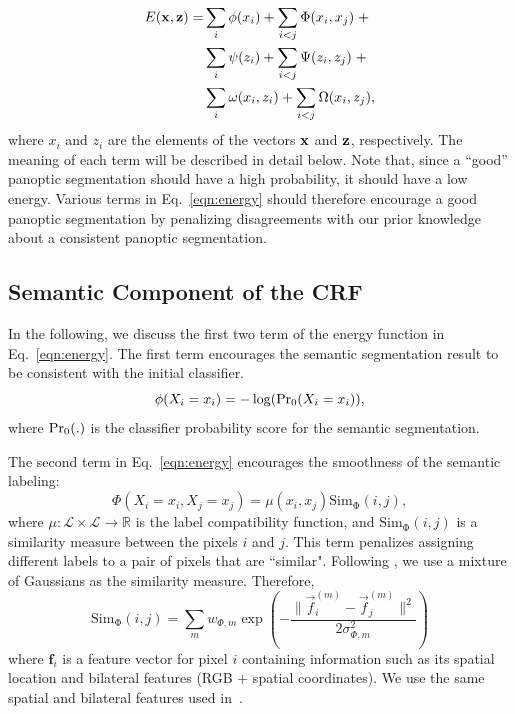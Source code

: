 \begin{equation}
\label{eqn:energy}
\begin{split}
E(\mathbf{x}, \mathbf{z}) =& \sum_i\phi(x_i) + \sum_{i < j}\Phi(x_i, x_j) \;+ \\
& \sum_i\psi(z_i) + \sum_{i < j}\Psi(z_i, z_j) \; + \\
& \sum_i\omega(x_i, z_i) + \sum_{i < j}\Omega(x_i, z_j),
\end{split}
\end{equation}
where $x_i$ and $z_i$ are the elements of the vectors $\mathbf{x}$ and $\mathbf{z}$, respectively. The meaning of each term will be described in detail below. Note that, since a ``good'' panoptic segmentation should have a high probability, it should have a low energy. Various terms in Eq.~\eqref{eqn:energy} should therefore encourage a good panoptic segmentation by penalizing disagreements with our prior knowledge about a consistent panoptic segmentation. %

\subsection{Semantic Component of the CRF}
In the following, we discuss the first two term of the energy function in Eq.~\eqref{eqn:energy}. The first term encourages the semantic segmentation result to be consistent with the initial classifier.
\begin{equation}
\phi(X_i = x_i) = - \log(\operatorname{Pr_0}(X_i = x_i)),
\end{equation}
where $\operatorname{Pr_0}(.)$ is the classifier probability score for the semantic segmentation. 

The second term in Eq.~\eqref{eqn:energy} encourages the smoothness of the semantic labeling:
\begin{equation}
\label{eq:similarity}
\Phi(X_i = x_i, X_j = x_j) = \mu(x_i, x_j) \operatorname{Sim_\Phi}(i, j),
\end{equation}
where $\mu: \mathcal{L} \times \mathcal{L} \to \mathbb{R}$ is the label compatibility function, and $\operatorname{Sim_\Phi}(i, j)$ is a similarity measure between the pixels $i$ and $j$. This term penalizes assigning different labels to a pair of pixels that are ``similar". Following \cite{densecrf}, we use a mixture of Gaussians as the similarity measure. Therefore,
\begin{equation}
\label{eqn:kernels}
\operatorname{Sim_\Phi}(i, j) = \sum_m w_{\Phi, m} \exp\left(-\frac{\|\vec{f}_i^{(m)} - \vec{f}_j^{(m)}\|^2}{2\sigma_{\Phi,m}^2}\right)
\end{equation}
where $\mathbf{f}_i$ is a feature vector for pixel $i$ containing information such as its spatial location and bilateral features (RGB + spatial coordinates). We use the same spatial and bilateral features used in~\cite{densecrf}.
